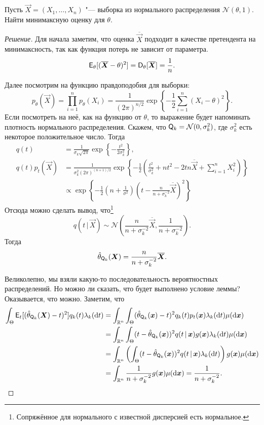 \begin{problem}
    Пусть $\vec{X} = (X_{1}, \ldots, X_{n})$ "--- выборка из нормального распределения $\mathcal{N}(\theta, 1)$. Найти минимаксную оценку для $\theta$.
\end{problem}
\begin{proof}[Решение]
    Для начала заметим, что оценка $\overline{\vec{X}}$ подходит в качестве претендента на минимаксность, так как функция потерь не зависит от параметра.
    \[
        \operatorname{\mathsf{E}}_{\theta}[(\overline{\bm{X}} - \theta)^{2}] = \operatorname{\mathsf{D}}_{\theta}[\overline{\bm{X}}] = \frac{1}{n}.
    \]
    
    Далее посмотрим на функцию правдоподобия для выборки:
    \[
        p_{\theta}(\vec{X}) = \prod_{i = 1}^{n} p_{\theta}(X_{i}) = \frac{1}{(2\pi)^{n/2}}\exp\left\{-\frac{1}{2}\sum_{i = 1}^{n} (X_{i} - \theta)^{2}\right\}.
    \]
    Если посмотреть на неё, как на функцию от $\theta$, то выражение будет напоминать плотность нормального распределения. Скажем, что $\mathsf{Q}_{k} = \mathcal{N}(0, \sigma^{2}_{k})$, где $\sigma_{k}^{2}$ есть некоторое положительное число. Тогда
    \begin{align*}
        q(t) &= \frac{1}{\sigma_{k}\sqrt{2\pi}}\exp\left\{-\frac{t^{2}}{2\sigma_{k}^{2}}\right\}, \\
        q(t)p_{t}(\vec{X})
        &= \frac{1}{\sigma_{k}^{2}(2\pi)^{(n + 1)/2}}\exp\left\{-\frac{1}{2}\left(\frac{t^{2}}{\sigma_{k}^{2}} + nt^{2} - 2tn\overline{\vec{X}} + \sum_{i = 1}^{n}X_{i}^{2}\right)\right\} \\
        &\propto \exp\left\{-\frac{1}{2}\left(n + \frac{1}{\sigma^{2}}\right)\left(t - \frac{n}{n + \sigma_{k}^{-2}}\overline{\vec{X}}\right)^{2}\right\}
    \end{align*}
    Отсюда можно сделать вывод, что\footnote{Сопряжённое для нормального с известной дисперсией есть нормальное.}
    \[
        q(t\,|\,\vec{X}) \sim \mathcal{N}\left(\frac{n}{n + \sigma_{k}^{-2}}\overline{\vec{X}}, \frac{1}{n + \sigma_{k}^{-2}}\right).
    \]
    Тогда
    \[
        \hat{\theta}_{\mathsf{Q}_{k}}(\bm{X}) = \frac{n}{n + \sigma_{k}^{-2}}\overline{\bm{X}}.
    \]
    
    Великолепно, мы взяли какую-то последовательность вероятностных распределений. Но можно ли сказать, что будет выполнено условие леммы? Оказывается, что можно. Заметим, что
    \begin{align*}
        \int_{\Theta} \operatorname{\mathsf{E}}_{t}[(\hat{\theta}_{\mathsf{Q}_{k}}(\bm{X}) - t)^{2}]q_{k}(t)\lambda_{k}(\dd t)
        &= \int_{\mathbb{R}^{n}} \int_{\Theta} (\hat{\theta}_{\mathsf{Q}_{k}}(\bm{x}) - t)^{2}q_{k}(t)p_{t}(\bm{x})\lambda_{k}(\dd t)\mu(\dd \bm{x}) \\
        &= \int_{\mathbb{R}^{n}} \int_{\Theta} (t - \hat{\theta}_{ \mathsf{Q}_{k}}(\bm{x}))^{2}q(t\,|\,\bm{x})g(\bm{x})\lambda_{k}(\dd t)\mu(\dd \bm{x}) \\
        &= \int_{\mathbb{R}^{n}} \left(\int_{\Theta} (t - \hat{\theta}_{ \mathsf{Q}_{k}}(\bm{x}))^{2}q(t\,|\,\bm{x})\lambda_{k}(\dd t)\right)g(\bm{x})\mu(\dd \bm{x}) \\
        &= \int_{\mathbb{R}^{n}} \frac{1}{n + \sigma_{k}^{-2}}g(\bm{x})\mu(\dd \bm{x})
        = \frac{1}{n + \sigma_{k}^{-2}}.
    \end{align*}
    

\end{proof}
